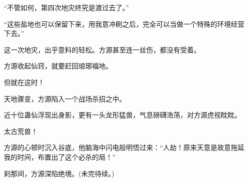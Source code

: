 \begin{this_body}
“不管如何，第四次地灾终究是渡过去了。”

“这些盐地也可以保留下来，用我意冲刷之后，完全可以当做一个特殊的环境经营下去。”

这一次地灾，出乎意料的轻松。方源甚至连一丝伤，都没有受着。

方源收起仙窍，就要赶回琅琊福地。

但就在这时！

天地骤变，方源陷入一个战场杀招之中。

近十位蛊仙浮现出身影，更有一头龙形猛兽，气息磅礴浩荡，对方源虎视眈眈。

太古荒兽！

方源的心顿时沉入谷底，他脑海中闪电般明悟过来：“人劫！原来天意是故意拖延我的时间，布置出了这个必杀的局！”

刹那间，方源深陷绝境。(未完待续。)

\end{this_body}

